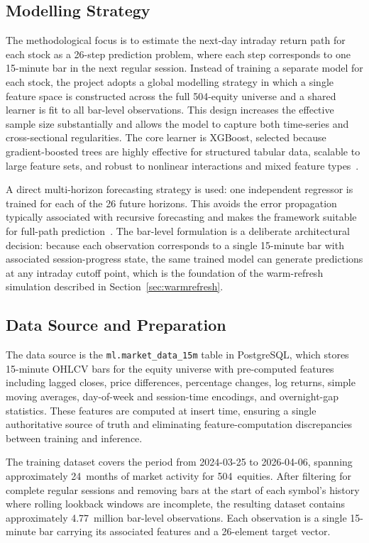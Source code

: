 \documentclass[conference]{IEEEtran}
\begin{document}
\subsection{Modelling Strategy}
The methodological focus is to estimate the next-day intraday return path for each stock as a 26-step prediction problem, where each step corresponds to one 15-minute bar in the next regular session. Instead of training a separate model for each stock, the project adopts a global modelling strategy in which a single feature space is constructed across the full 504-equity universe and a shared learner is fit to all bar-level observations. This design increases the effective sample size substantially and allows the model to capture both time-series and cross-sectional regularities. The core learner is XGBoost, selected because gradient-boosted trees are highly effective for structured tabular data, scalable to large feature sets, and robust to nonlinear interactions and mixed feature types~\cite{friedman2001greedy,chen2016xgboost}.

A direct multi-horizon forecasting strategy is used: one independent regressor is trained for each of the 26 future horizons. This avoids the error propagation typically associated with recursive forecasting and makes the framework suitable for full-path prediction~\cite{lim2021time}. The bar-level formulation is a deliberate architectural decision: because each observation corresponds to a single 15-minute bar with associated session-progress state, the same trained model can generate predictions at any intraday cutoff point, which is the foundation of the warm-refresh simulation described in Section~\ref{sec:warmrefresh}.

\subsection{Data Source and Preparation}
The data source is the \texttt{ml.market\_data\_15m} table in PostgreSQL, which stores 15-minute OHLCV bars for the equity universe with pre-computed features including lagged closes, price differences, percentage changes, log returns, simple moving averages, day-of-week and session-time encodings, and overnight-gap statistics. These features are computed at insert time, ensuring a single authoritative source of truth and eliminating feature-computation discrepancies between training and inference.

The training dataset covers the period from 2024-03-25 to 2026-04-06, spanning approximately 24~months of market activity for 504~equities. After filtering for complete regular sessions and removing bars at the start of each symbol's history where rolling lookback windows are incomplete, the resulting dataset contains approximately 4.77~million bar-level observations. Each observation is a single 15-minute bar carrying its associated features and a 26-element target vector.
\end{document}
